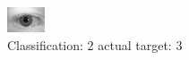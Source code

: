 \begin{figure}[h!]
\begin{center}
\includegraphics[width=0.60\columnwidth]{figures/ID624_class_2_target_3.png}
\end{center}
\caption{ Classification: 2 actual target: 3}
\label{fig:ID624_class_2_target_3}
\end{figure}
